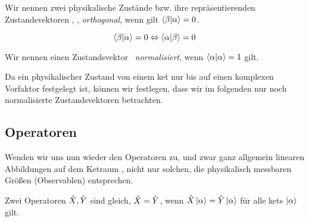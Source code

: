 \begin{defn}
 Wir nennen zwei physikalische Zust\"ande bzw. ihre repr\"asentierenden Zustandsvektoren \keta, \ketb, \emph{orthogonal}, wenn gilt $\braket{\beta | \alpha} = 0$.
\end{defn}
\begin{notiz}
 \begin{equation}
  \braket{\beta | \alpha} = 0 \Leftrightarrow \braket{\alpha | \beta} = 0
 \end{equation}
\end{notiz}

\begin{defn}
 Wir nennen einen Zustandsvektor \keta\ \emph{normalisiert}, wenn $\braket{\alpha | \alpha} = 1$ gilt.
\end{defn}
\begin{konv}
 Da ein physikalischer Zustand von einem ket nur bis auf einen komplexen Vorfaktor festgelegt ist, k\"onnen wir festlegen, dass wir im folgenden nur noch normalisierte Zustandsvektoren betrachten.
\end{konv}

\subsection{Operatoren}
Wenden wir uns nun wieder den Operatoren zu, und zwar ganz allgemein linearen Abbildungen auf dem Ketraum \hs, nicht nur solchen, die physikalisch messbaren Gr\"o\ss{}en (Observablen) entsprechen.

\begin{defn}
 Zwei Operatoren $\hat{X}, \hat{Y}$ sind gleich, $\hat{X}=\hat{Y}$, wenn $\hat{X} \ket{\alpha} = \hat{Y} \ket{\alpha}$ f\"ur alle kets $\ket{\alpha}$ gilt.
\end{defn}

